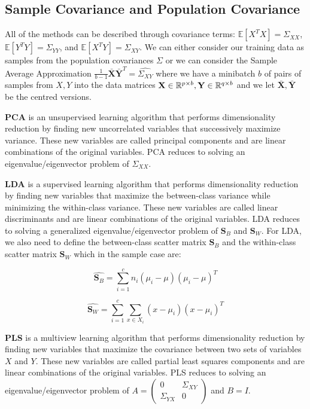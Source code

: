 \subsection{Sample Covariance and Population Covariance}
All of the methods can be described through covariance terms: $\mathbb{E}[X^TX]=\Sigma_{XX}$, $\mathbb{E}[Y^TY]=\Sigma_{YY}$, and $\mathbb{E}[X^TY]=\Sigma_{XY}$. We can either consider our training data as samples from the population covariances $\Sigma$ or we can consider the Sample Average Approximation $\frac{1}{b-1}\bar{\mathbf{X}} \bar{\mathbf{Y}}^T=\hat{\Sigma_{XY}}$ where we have a minibatch $b$ of pairs of samples from $X,Y$ into the data matrices $\mathbf{X} \in \mathbb{R}^{p \times b}, \mathbf{Y} \in \mathbb{R}^{q \times b}$ and we let $\bar{\mathbf{X}},\bar{\mathbf{Y}}$ be the centred versions.

\textbf{PCA} is an unsupervised learning algorithm that performs dimensionality reduction by finding new uncorrelated variables that successively maximize variance. These new variables are called principal components and are linear combinations of the original variables. PCA reduces to solving an eigenvalue/eigenvector problem of $\Sigma_{XX}$.

\textbf{LDA} is a supervised learning algorithm that performs dimensionality reduction by finding new variables that maximize the between-class variance while minimizing the within-class variance. These new variables are called linear discriminants and are linear combinations of the original variables. LDA reduces to solving a generalized eigenvalue/eigenvector problem of $\mathbf{S}_B$ and $\mathbf{S}_W$. For LDA, we also need to define the between-class scatter matrix $\mathbf{S}_B$ and the within-class scatter matrix $\mathbf{S}_W$ which in the sample case are:

$$
    \hat{\mathbf{S}_B} = \sum_{i=1}^{c} n_i (\mu_i - \mu)(\mu_i - \mu)^T
$$

$$
    \hat{\mathbf{S}_W} = \sum_{i=1}^{c} \sum_{x \in X_i} (x - \mu_i)(x - \mu_i)^T
$$

\textbf{PLS} is a multiview learning algorithm that performs dimensionality reduction by finding new variables that maximize the covariance between two sets of variables $X$ and $Y$. These new variables are called partial least squares components and are linear combinations of the original variables. PLS reduces to solving an eigenvalue/eigenvector problem of $A=\begin{pmatrix} 0 & \Sigma_{XY} \\ \Sigma_{YX} & 0 \end{pmatrix}$ and $B=I$.

